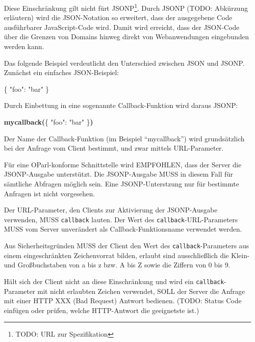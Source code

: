 \documentclass[,a4paper]{article}
\newenvironment{Shaded}{}{}
\newcommand{\DataTypeTok}[1]{\textcolor[rgb]{0.56,0.13,0.00}{{#1}}}
\newcommand{\StringTok}[1]{\textcolor[rgb]{0.25,0.44,0.63}{{#1}}}
\newcommand{\ErrorTok}[1]{\textcolor[rgb]{1.00,0.00,0.00}{\textbf{{#1}}}}
\newcommand{\NormalTok}[1]{{#1}}
\begin{document}
Diese Einschränkung gilt nicht fürt JSONP\footnote{TODO: URL zur
  Spezifikation}. Durch JSONP (TODO: Abkürzung erläutern) wird die
JSON-Notation so erweitert, dass der ausgegebene Code ausführbarer
JavaScript-Code wird. Damit wird erreicht, dass der JSON-Code über die
Grenzen von Domains hinweg direkt von Webanwendungen eingebunden werden
kann.

Das folgende Beispiel verdeutlicht den Unterschied zwischen JSON und
JSONP. Zunächst ein einfaches JSON-Beispiel:

\begin{Shaded}
\begin{Highlighting}[]
\NormalTok{\{}
    \DataTypeTok{"foo"}\NormalTok{: }\StringTok{"bar"}
\NormalTok{\}}
\end{Highlighting}
\end{Shaded}

Durch Einbettung in eine sogenannte Callback-Funktion wird daraus JSONP:

\begin{Shaded}
\begin{Highlighting}[]
\ErrorTok{mycallback(}\NormalTok{\{}
    \DataTypeTok{"foo"}\NormalTok{: }\StringTok{"bar"}
\NormalTok{\}}\ErrorTok{)}
\end{Highlighting}
\end{Shaded}

Der Name der Callback-Funktion (im Beispiel ``mycallback'') wird
grundsätzlich bei der Anfrage vom Client bestimmt, und zwar mittels
URL-Parameter.

Für eine OParl-konforme Schnittstelle wird EMPFOHLEN, dass der Server
die JSONP-Ausgabe unterstützt. Die JSONP-Ausgabe MUSS in diesem Fall für
sämtliche Abfragen möglich sein. Eine JSONP-Unterstzung nur für
bestimmte Anfragen ist nicht vorgesehen.

Der URL-Parameter, den Clients zur Aktivierung der JSONP-Ausgabe
verwenden, MUSS \texttt{callback} lauten. Der Wert des
\texttt{callback}-URL-Parameters MUSS vom Server unverändert als
Callback-Funktionsname verwendet werden.

Aus Sicherheitsgründen MUSS der Client den Wert des
\texttt{callback}-Parameters aus einem eingeschränkten Zeichenvorrat
bilden, erlaubt sind ausschließlich die Klein- und Großbuchstaben von a
bis z bzw. A bis Z sowie die Ziffern von 0 bis 9.

Hält sich der Client nicht an diese Einschränkung und wird ein
\texttt{callback}-Parameter mit nicht erlaubten Zeichen verwendet, SOLL
der Server die Anfrage mit einer HTTP XXX (Bad Request) Antwort
bedienen. (TODO: Status Code einfügen oder prüfen, welche HTTP-Antwort
die geeignetste ist.)
\end{document}
